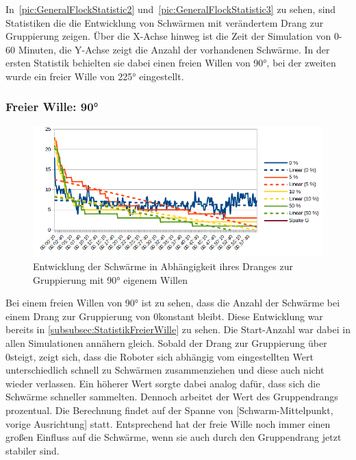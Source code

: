 In~\autoref{pic:GeneralFlockStatistic2} und~\autoref{pic:GeneralFlockStatistic3} zu sehen, sind Statistiken die die Entwicklung von Schwärmen mit verändertem Drang zur Gruppierung zeigen. Über die X-Achse hinweg ist die Zeit der Simulation von 0-60 Minuten, die Y-Achse zeigt die Anzahl der vorhandenen Schwärme. In der ersten Statistik behielten sie dabei einen freien Willen von 90°, bei der zweiten wurde ein freier Wille von 225° eingestellt.

\subsubsection*{Freier Wille: 90°}

\begin{figure}[h]
	\includegraphics[width=\textwidth, keepaspectratio]{graphics/Statistics/FlockGeneral/LocalRange1Speed01FreeWill90.png}
	\caption{Entwicklung der Schwärme in Abhängigkeit ihres Dranges zur Gruppierung mit 90° eigenem Willen}
	\label{pic:GeneralFlockStatistic2}
\end{figure}

Bei einem freien Willen von 90° ist zu sehen, dass die Anzahl der Schwärme bei einem Drang zur Gruppierung von 0\per konstant bleibt. Diese Entwicklung war bereits in \autoref{subsubsec:StatistikFreierWille} zu sehen. Die Start-Anzahl war dabei in allen Simulationen annähern gleich.
Sobald der Drang zur Gruppierung über 0\per steigt, zeigt sich, dass die Roboter sich abhängig vom eingestellten Wert unterschiedlich schnell zu Schwärmen zusammenziehen und diese auch nicht wieder verlassen. Ein höherer Wert sorgte dabei analog dafür, dass sich die Schwärme schneller sammelten. Dennoch arbeitet der Wert des Gruppendrangs prozentual. Die Berechnung findet auf der Spanne von [Schwarm-Mittelpunkt, vorige Ausrichtung] statt. Entsprechend hat der freie Wille noch immer einen großen Einfluss auf die Schwärme, wenn sie auch durch den Gruppendrang jetzt stabiler sind.

